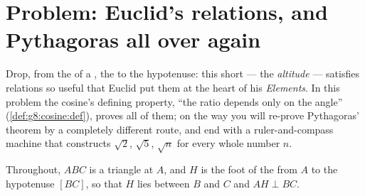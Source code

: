 \section{Problem: Euclid's relations, and Pythagoras all over
again}

\begin{problem}[{Weekend problem --- the altitude of a right
triangle: $AB^2 = BH \times BC$, $AH^2 = BH \times HC$, a second
proof of Pythagoras, and a machine for constructing square roots}]
\label{pb:g8:cosine:1}
Drop, from the  of a , the 
to the hypotenuse: this short  --- the \emph{altitude} ---
satisfies relations so useful that Euclid put them at the heart of
his \emph{Elements}. In this problem the cosine's defining
property, ``the ratio depends only on the angle''
(\cref{def:g8:cosine:def}), proves all of them; on the way you
will re-prove Pythagoras' theorem by a completely different route,
and end with a ruler-and-compass machine that constructs
$\sqrt2$, $\sqrt5$, $\sqrt{n}$ for every whole number $n$.

Throughout, $ABC$ is a triangle  at $A$, and $H$ is
the foot of the  from $A$ to the hypotenuse $[BC]$,
so that $H$ lies between $B$ and $C$ and $AH \perp BC$.


\end{problem}
